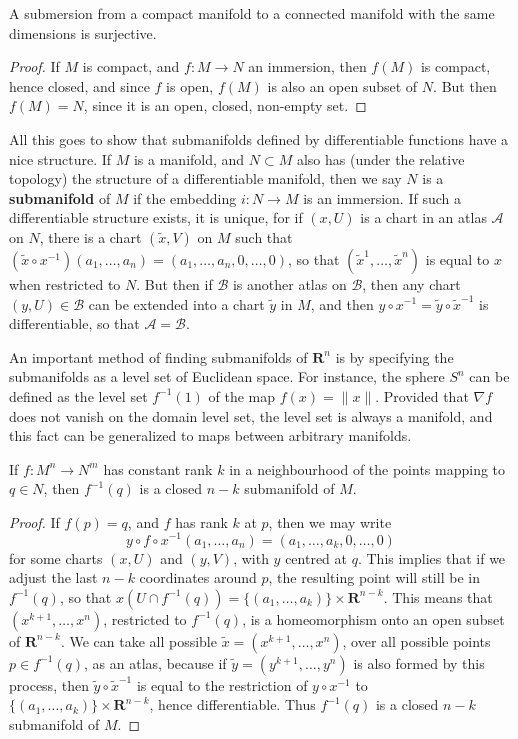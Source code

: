 \begin{corollary}
    A submersion from a compact manifold to a connected manifold with the same dimensions is surjective.
\end{corollary}
\begin{proof}
    If $M$ is compact, and $f: M \to N$ an immersion, then $f(M)$ is compact, hence closed, and since $f$ is open, $f(M)$ is also an open subset of $N$. But then $f(M) = N$, since it is an open, closed, non-empty set.
\end{proof}

All this goes to show that submanifolds defined by differentiable functions have a nice structure. If $M$ is a manifold, and $N \subset M$ also has (under the relative topology) the structure of a differentiable manifold, then we say $N$ is a {\bf submanifold} of $M$ if the embedding $i: N \to M$ is an immersion. If such a differentiable structure exists, it is unique, for if $(x,U)$ is a chart in an atlas $\mathcal{A}$ on $N$, there is a chart $(\tilde{x},V)$ on $M$ such that $(\tilde{x} \circ x^{-1})(a_1, \dots, a_n) = (a_1, \dots, a_n, 0, \dots, 0)$, so that $(\tilde{x}^1, \dots, \tilde{x}^n)$ is equal to $x$ when restricted to $N$. But then if $\mathcal{B}$ is another atlas on $\mathcal{B}$, then any chart $(y,U) \in \mathcal{B}$ can be extended into a chart $\tilde{y}$ in $M$, and then $y \circ x^{-1} = \tilde{y} \circ \tilde{x}^{-1}$ is differentiable, so that $\mathcal{A} = \mathcal{B}$.

An important method of finding submanifolds of $\mathbf{R}^n$ is by specifying the submanifolds as a level set of Euclidean space. For instance, the sphere $S^n$ can be defined as the level set $f^{-1}(1)$ of the map $f(x) = \| x \|$. Provided that $\nabla f$ does not vanish on the domain level set, the level set is always a manifold, and this fact can be generalized to maps between arbitrary manifolds.

\begin{theorem}
    If $f: M^n \to N^m$ has constant rank $k$ in a neighbourhood of the points mapping to $q \in N$, then $f^{-1}(q)$ is a closed $n - k$ submanifold of $M$.
\end{theorem}
\begin{proof}
    If $f(p) = q$, and $f$ has rank $k$ at $p$, then we may write
    \[ y \circ f \circ x^{-1}(a_1, \dots, a_n) = (a_1, \dots, a_k, 0 ,\dots, 0) \]
    for some charts $(x,U)$ and $(y,V)$, with $y$ centred at $q$. This implies that if we adjust the last $n - k$ coordinates around $p$, the resulting point will still be in $f^{-1}(q)$, so that $x(U \cap f^{-1}(q)) = \{ (a_1, \dots, a_k) \} \times \mathbf{R}^{n-k}$. This means that $(x^{k+1}, \dots, x^n)$, restricted to $f^{-1}(q)$, is a homeomorphism onto an open subset of $\mathbf{R}^{n-k}$. We can take all possible $\tilde{x} = (x^{k+1}, \dots, x^n)$, over all possible points $p \in f^{-1}(q)$, as an atlas, because if $\tilde{y} = (y^{k+1}, \dots, y^n)$ is also formed by this process, then $\tilde{y} \circ \tilde{x}^{-1}$ is equal to the restriction of $y \circ x^{-1}$ to $\{ (a_1, \dots, a_k) \} \times \mathbf{R}^{n-k}$, hence differentiable. Thus $f^{-1}(q)$ is a closed $n - k$ submanifold of $M$.
\end{proof}

